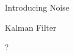 \documentclass[12pt]{beamer}
\begin{document}
\begin{frame}{Introducing Noise}

\end{frame}

\begin{frame}{Kalman Filter}

\end{frame}

\begin{frame}{?}

\end{frame}

%
%
\end{document}
